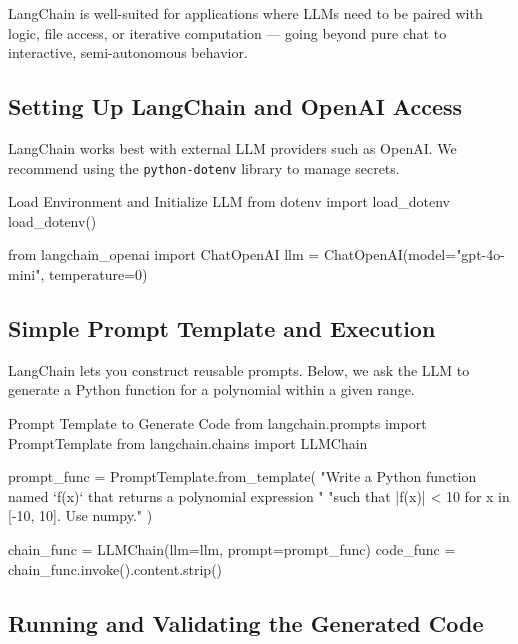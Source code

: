 LangChain is well-suited for applications where LLMs need to be paired with logic, file access, or iterative computation — going beyond pure chat to interactive, semi-autonomous behavior.

%
\subsection*{Setting Up LangChain and OpenAI Access}

LangChain works best with external LLM providers such as OpenAI. We recommend using the \texttt{python-dotenv} library to manage secrets.

\begin{codeonly}{Load Environment and Initialize LLM}
from dotenv import load_dotenv
load_dotenv()

from langchain_openai import ChatOpenAI
llm = ChatOpenAI(model="gpt-4o-mini", temperature=0)
\end{codeonly}

%
\subsection*{Simple Prompt Template and Execution}

LangChain lets you construct reusable prompts. Below, we ask the LLM to generate a Python function for a polynomial within a given range.

\begin{codeonly}{Prompt Template to Generate Code}
from langchain.prompts import PromptTemplate
from langchain.chains import LLMChain

prompt_func = PromptTemplate.from_template(
    "Write a Python function named `f(x)` that returns a polynomial expression "
    "such that |f(x)| < 10 for x in [-10, 10]. Use numpy."
)

chain_func = LLMChain(llm=llm, prompt=prompt_func)
code_func = chain_func.invoke({}).content.strip()
\end{codeonly}

%
\subsection*{Running and Validating the Generated Code}

